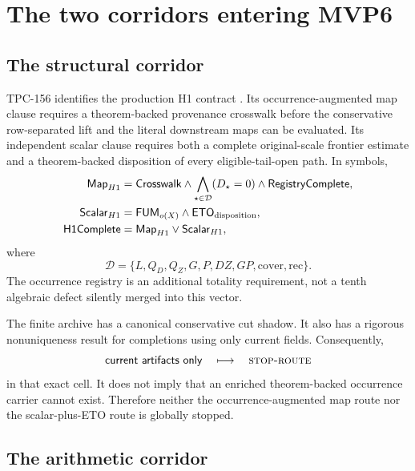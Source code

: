 \documentclass[11pt]{article}
\theoremstyle{definition}
\theoremstyle{remark}
\newcommand{\STOPR}{\textnormal{\textsc{stop-route}}}
\begin{document}
\section{The two corridors entering MVP6}

\subsection{The structural corridor}

TPC-156 identifies the production H1 contract
\citep{WangTPC156}.  Its occurrence-augmented map clause requires a
theorem-backed provenance crosswalk before the conservative
row-separated lift and the literal downstream maps can be evaluated.
Its independent scalar clause requires both a complete original-scale
frontier estimate and a theorem-backed disposition of every
eligible-tail-open path.  In symbols,
\[
\begin{split}
\mathsf{Map}_{H1}
={}&
\mathsf{Crosswalk}\wedge
\bigwedge_{\star\in\mathcal D} (D_\star=0)
\wedge\mathsf{RegistryComplete},\\
\mathsf{Scalar}_{H1}
={}&
\mathsf{FUM}_{o(X)}
\wedge\mathsf{ETO}_{\rm disposition},\\
\mathsf{H1Complete}
={}&
\mathsf{Map}_{H1}\vee\mathsf{Scalar}_{H1},
\end{split}
\]
where
\[
 \mathcal D=\{L,Q_D,Q_Z,G,P,DZ,GP,\mathrm{cover},\mathrm{rec}\}.
\]
The occurrence registry is an additional totality requirement, not a
tenth algebraic defect silently merged into this vector.

The finite archive has a canonical conservative cut shadow.  It also
has a rigorous nonuniqueness result for completions using only current
fields.  Consequently,
\[
 \mathsf{current\ artifacts\ only}
 \quad\longmapsto\quad
 \STOPR
\]
in that exact cell.  It does not imply that an enriched
theorem-backed occurrence carrier cannot exist.  Therefore neither
the occurrence-augmented map route nor the scalar-plus-ETO route is
globally stopped.

\subsection{The arithmetic corridor}
\end{document}
